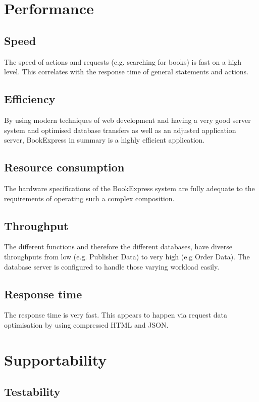 \documentclass[11pt,a4paper,oneside,svgnames]{report}
\begin{document}
\section{Performance}

\subsection{Speed}
The speed of actions and requests (e.g. searching for books) is fast on a high level. This correlates with the response time of general statements and actions.

\subsection{Efficiency}
By using modern techniques of web development and having a very good server system and optimised database transfers as well as an adjusted application server, BookExpress in summary is a highly efficient application.

\subsection{Resource consumption}
The hardware specifications of the BookExpress system are fully adequate to the requirements of operating such a complex composition.

\subsection{Throughput}
The different functions and therefore the different databases, have diverse throughputs from low (e.g. Publisher Data) to very high (e.g Order Data). The database server is configured to handle those varying workload easily.

\subsection{Response time}
The response time is very fast. This appears to happen via request data optimisation by using compressed HTML and JSON.


\section{Supportability}

\subsection{Testability}
\end{document}
